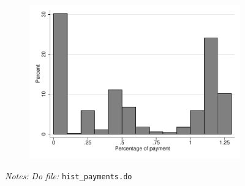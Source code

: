 \documentclass[11pt]{article}
\begin{document}
\begin{figure}[H]
\begin{center}
\begin{subfigure}{.31\textwidth}
        \includegraphics[width=\textwidth]{Figuras/hist_porc_pay_pro_9.pdf}    
    \end{subfigure}        
    \end{center}
     \footnotesize \textit{Notes: } 
      \footnotesize{ \textit{Do file: }  \texttt{hist\_payments.do}}
\end{figure}
\end{document}
